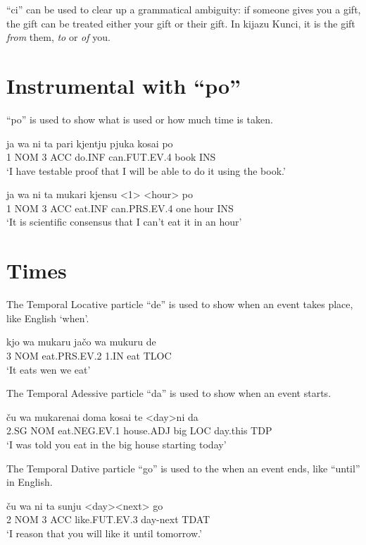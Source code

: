 \documentclass{clgrammar}
\begin{document}
``ci'' can be used to clear up a grammatical ambiguity: if someone gives you a gift, the gift can be treated either your gift or their gift. In kijazu Kunci, it is the gift \textit{from} them, \textit{to} or \textit{of} you. 

\section{Instrumental with ``po''}
``po'' is used to show what is used or how much time is taken.

\begin{exe}
	\ex
	\gll ja wa ni ta pari kjentju pjuka kosai po \\
	1 NOM 3 ACC do.INF can.FUT.EV.4 book INS \\
	\trans `I have testable proof that I will be able to do it using the book.' 
\end{exe}

\begin{exe}
	\ex
	\gll ja wa ni ta mukari kjensu <1> <hour> po\\
	1 NOM 3 ACC eat.INF can.PRS.EV.4 one hour INS\\
	\trans `It is scientific consensus that I can't eat it in an hour' 
\end{exe}



\section{Times}

The Temporal Locative particle ``de'' is used to show when an event takes place, like English `when'.

\begin{exe}
	\ex
	\gll kjo wa mukaru jačo wa mukuru de \\
	3 NOM eat.PRS.EV.2 1.IN eat TLOC \\
	\trans `It eats wen we eat'
\end{exe}

The Temporal Adessive particle ``da'' is used to show when an event starts.
\begin{exe}
	\ex
	\gll ču wa mukarenai doma kosai te <day>ni da \\
	2.SG NOM eat.NEG.EV.1 house.ADJ big LOC day.this TDP \\
	\trans `I was told you eat in the big house starting today'
\end{exe}

The Temporal Dative particle ``go'' is used to the when an event ends, like ``until'' in English.
\begin{exe}
	\ex
	\gll ču wa ni ta sunju <day><next> go \\
	2 NOM 3 ACC like.FUT.EV.3 day-next TDAT \\
	\trans `I reason that you will like it until tomorrow.'
\end{exe}
\end{document}
